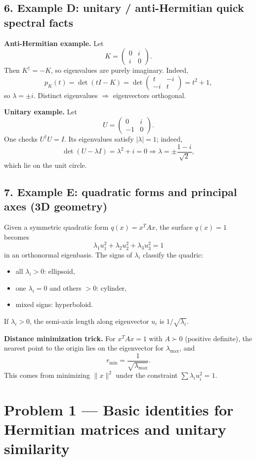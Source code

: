 \documentclass[12pt,a4paper]{article}
\theoremstyle{plain}
\theoremstyle{definition}      %
\begin{document}
\subsection*{6. Example D: unitary / anti-Hermitian quick spectral facts}

\textbf{Anti-Hermitian example.}
Let
\[
K=\begin{pmatrix}0&i\\ i&0\end{pmatrix}.
\]
Then $K^\dagger=-K$, so eigenvalues are purely imaginary. Indeed,
\[
p_K(t)=\det(tI-K)=\det\begin{pmatrix}t&-i\\-i&t\end{pmatrix}=t^2+1,
\]
so $\lambda=\pm i$. Distinct eigenvalues $\Rightarrow$ eigenvectors orthogonal.

\textbf{Unitary example.}
Let
\[
U=\begin{pmatrix}0&i\\-1&0\end{pmatrix}.
\]
One checks $U^\dagger U=I$. Its eigenvalues satisfy $|\lambda|=1$; indeed,
\[
\det(U-\lambda I)=\lambda^2+i=0 \Rightarrow \lambda=\pm\frac{1-i}{\sqrt2},
\]
which lie on the unit circle.

\subsection*{7. Example E: quadratic forms and principal axes (3D geometry)}

Given a symmetric quadratic form $q(x)=x^TAx$, the surface $q(x)=1$ becomes
\[
\lambda_1 u_1^2+\lambda_2 u_2^2+\lambda_3 u_3^2=1
\]
in an orthonormal eigenbasis. The signs of $\lambda_i$ classify the quadric:
\begin{itemize}
	\item all $\lambda_i>0$: ellipsoid,
	\item one $\lambda_i=0$ and others $>0$: cylinder,
	\item mixed signs: hyperboloid.
\end{itemize}
If $\lambda_i>0$, the semi-axis length along eigenvector $u_i$ is $1/\sqrt{\lambda_i}$.

\textbf{Distance minimization trick.}
For $x^TAx=1$ with $A\succ0$ (positive definite),
the nearest point to the origin lies on the eigenvector for $\lambda_{\max}$, and
\[
r_{\min}=\frac{1}{\sqrt{\lambda_{\max}}}.
\]
This comes from minimizing $\|x\|^2$ under the constraint $\sum \lambda_i u_i^2=1$.


\section*{Problem 1 — Basic identities for Hermitian matrices and unitary similarity}
\end{document}
